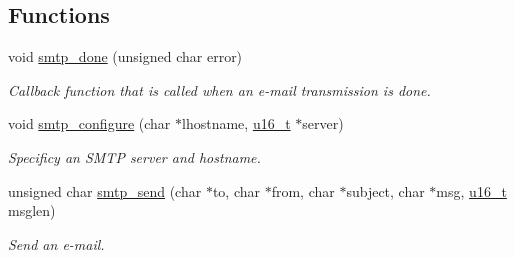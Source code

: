 \subsection*{Functions}
\begin{CompactItemize}
\item 
void \hyperlink{a00080_gb1fc692a2700b7a51517724364683f67}{smtp\_\-done} (unsigned char error)
\begin{CompactList}\small\item\em Callback function that is called when an e-mail transmission is done. \item\end{CompactList}\item 
void \hyperlink{a00080_gb190336472b91d4bbfa1eadaa54151e2}{smtp\_\-configure} (char $\ast$lhostname, \hyperlink{a00070_gfc6499c1f28697aa3bfc2804d496fd11}{u16\_\-t} $\ast$server)
\begin{CompactList}\small\item\em Specificy an SMTP server and hostname. \item\end{CompactList}\item 
unsigned char \hyperlink{a00080_g86f84869cd17114c9837b5ca4618ee21}{smtp\_\-send} (char $\ast$to, char $\ast$from, char $\ast$subject, char $\ast$msg, \hyperlink{a00070_gfc6499c1f28697aa3bfc2804d496fd11}{u16\_\-t} msglen)
\begin{CompactList}\small\item\em Send an e-mail. \item\end{CompactList}\end{CompactItemize}
